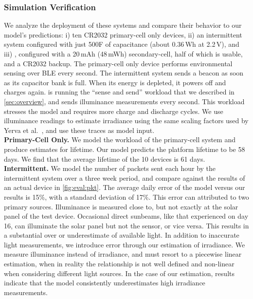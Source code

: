 \subsubsection{Simulation Verification}
\label{sec:eval:model}
We analyze the deployment of these systems
and compare their behavior to our
model's predictions: i) ten CR2032 primary-cell only devices, ii) an
intermittent system configured with just 500\textmu F of capacitance (about
0.36\,\textmu Wh at 2.2\,V), and iii) \name, configured with a 20\,mAh
(48\,mWh) secondary-cell, half of which is usable, and a CR2032 backup.  The
primary-cell only device performs environmental sensing over BLE every second.
The intermittent system  sends a beacon as soon as its capacitor bank is full.
When its energy is depleted, it powers off and charges
again. \name is running the ``sense and send'' workload that we described in
\cref{sec:overview}, and sends illuminance measurements every second. This
workload stresses the model and requires more charge and discharge cycles.  We
use \name illuminance readings to estimate irradiance using the same scaling factors used by
Yerva et al.~\cite{yervaGrafting12}, and use these traces as
model input.\\

\vspace{-6pt}
\noindent
\textbf{Primary-Cell Only.}
We model the workload of the primary-cell system and produce estimates for
lifetime.  Our model predicts the platform lifetime
to be 58 days.  We find that the average lifetime of the 10 devices is 61 days.
\\

\vspace{-6pt}
\noindent
\textbf{Intermittent.}
We model the number of packets sent each hour by the
intermittent system over a three week period, and compare against the results of an actual device in
\cref{fig:eval:pkt}.
The average daily error of the model versus our results is 15\%, with a standard deviation of
17\%. This error can attributed to two primary sources. Illuminance is measured
close to, but not exactly at the solar panel of the test device. Occasional
direct sunbeams, like that experienced on day 16, can illuminate the solar
panel but not the sensor, or vice versa. This
results in a substantial over or underestimate of available light. In addition
to inaccurate light measurements, we introduce error through our estimation of
irradiance. We measure illuminance
instead of irradiance, and must resort to a piecewise linear estimation, when
in reality the relationship is not well defined and non-linear when considering
different light sources. In the case of our estimation, results
indicate that the model consistently underestimates high irradiance measurements.\\

